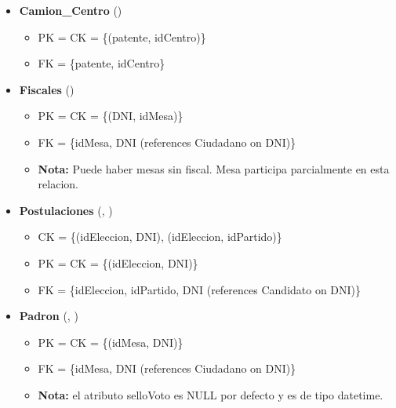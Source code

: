 \begin{itemize}
	
	\item \textbf{Camion\_Centro} () 
	\begin{itemize}
		\item PK = CK = \{(patente, idCentro)\}
		\item FK = \{patente, idCentro\}
	\end{itemize}
	\vspace{1mm}

	\item \textbf{Fiscales} () 
	\begin{itemize}
		\item PK = CK = \{(DNI, idMesa)\}
		\item FK = \{idMesa, DNI  (references Ciudadano on DNI)\}
		\item \textbf{Nota:} Puede haber mesas sin fiscal. Mesa participa parcialmente en esta relacion.
	\end{itemize}
	\vspace{1mm}

	\item \textbf{Postulaciones} (, ) 
	\begin{itemize}
		\item CK = \{(idEleccion, DNI), (idEleccion, idPartido)\}
		\item PK = CK = \{(idEleccion, DNI)\}
		\item FK = \{idEleccion, idPartido, DNI (references Candidato on DNI)\}
	\end{itemize}
	\vspace{1mm}
	
	\item \textbf{Padron} (, ) 
	\begin{itemize}
		\item PK = CK = \{(idMesa, DNI)\}
		\item FK = \{idMesa, DNI (references Ciudadano on DNI)\}
		\item \textbf{Nota:} el atributo selloVoto es NULL por defecto y es de tipo datetime.
	\end{itemize}
	\vspace{1mm}

\end{itemize}

